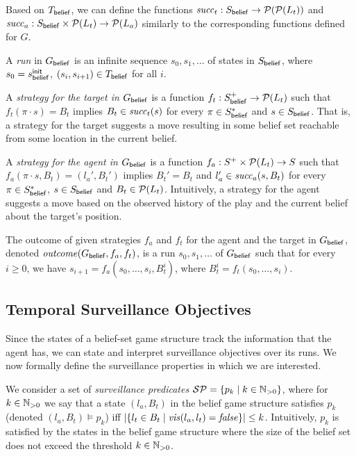 Based on  $T_{\mathsf{belief}}$, we can define the functions $\mathit{succ}_t : S_{\mathsf{belief}} \to \mathcal{P}(\mathcal{P}(L_t))$ and  $\mathit{succ}_a : S_{\mathsf{belief}} \times \mathcal{P}(L_t) \to \mathcal{P}(L_a)$ similarly to the corresponding functions defined for $G$. 

A \emph{run} in $G_{\mathsf{belief}}$ is an infinite sequence $s_0,s_1,\ldots$ of states in $S_{\mathsf{belief}}$, where $s_0 = s_{\mathsf{belief}}^{\mathsf{init}}$,  $(s_i,s_{i+1}) \in T_{\mathsf{belief}}$ for all $i$. 

A \emph{strategy for the target in $G_{\mathsf{belief}}$} is a function $f_t: S_{\mathsf{belief}}^+ \to \mathcal{P}(L_t)$ such that $f_t(\pi\cdot s) = B_t$ implies $B_t \in \mathit{succ}_t(s)$ for every $\pi \in S_{\mathsf{belief}}^*$ and $s \in S_{\mathsf{belief}}$. That is, a strategy for the target suggests a move resulting in some belief set reachable from some location in the current belief.

A \emph{strategy for the agent in $G_{\mathsf{belief}}$} is a function $f_a : S^+ \times \mathcal{P}(L_t) \to S$ such that $f_a(\pi\cdot s,B_t) = (l_a',B_t')$ implies $B_t' = B_t$ and $l_a' \in \mathit{succ}_a(s,B_t)$ for every $\pi \in S_{\mathsf{belief}}^*$, $s \in S_{\mathsf{belief}}$ and $B_t \in \mathcal{P}(L_t)$. Intuitively, a strategy for the agent suggests a move based on the observed history of the play and the current belief about the target's position.

The outcome of given strategies $f_a$ and $f_t$ for the agent and the target in $G_{\mathsf{belief}}$, denoted $\mathit{outcome}(G_{\mathsf{belief}},f_a,f_t)$, is a run $s_0,s_1,\ldots$ of $G_{\mathsf{belief}}$ such that for every $i \geq 0$, we have $s_{i+1} = f_a(s_0,\ldots,s_i,B_t^i)$, where $B_t^i = f_t(s_0,\ldots,s_i)$.

\subsection{Temporal Surveillance Objectives}
Since the states of a belief-set game structure track the information that the agent has, we can state and interpret surveillance objectives over its runs. We now formally define the surveillance properties in which we are interested. 

We consider a set of \emph{surveillance predicates} $\mathcal{SP} = \{p_k \mid k \in \mathbb{N}_{>0}\}$, where for $k \in \mathbb{N}_{>0}$ we say that a state $(l_a,B_t)$ in the belief game structure satisfies $p_k$ (denoted $(l_a,B_t) \models p_k$) iff 
$|\{l_t \in B_t \mid \mathit{vis}(l_a,l_t)  = \mathit{false} \}| \leq k$. Intuitively, $p_k$ is satisfied by the states in the belief game structure where the size of the belief set does not exceed the threshold $k \in \mathbb{N}_{>0}$.

